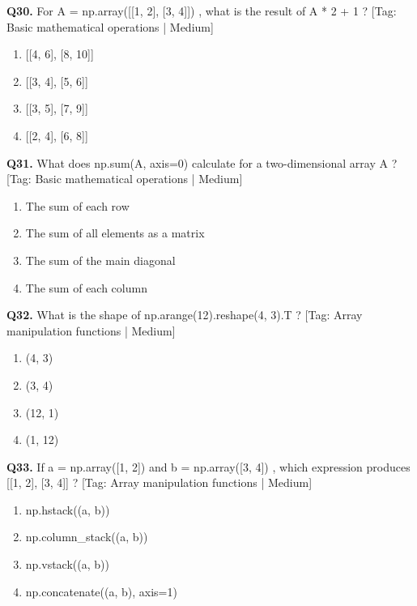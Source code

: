 \vspace{2mm}
\noindent\textbf{Q30.} For A = np.array([[1, 2], [3, 4]]) , what is the result of A * 2 + 1 ? \hfill [Tag: Basic mathematical operations | Medium]
\begin{enumerate}[label=(\alph*),topsep=2pt,itemsep=1pt,partopsep=0pt,parsep=0pt]
    \item {[[4, 6], [8, 10]]}
    \item {[[3, 4], [5, 6]]}
    \item {[[3, 5], [7, 9]]}
    \item {[[2, 4], [6, 8]]}
\end{enumerate}
\vspace{2mm}
\noindent\textbf{Q31.} What does np.sum(A, axis=0) calculate for a two-dimensional array A ? \hfill [Tag: Basic mathematical operations | Medium]
\begin{enumerate}[label=(\alph*),topsep=2pt,itemsep=1pt,partopsep=0pt,parsep=0pt]
    \item {The sum of each row}
    \item {The sum of all elements as a matrix}
    \item {The sum of the main diagonal}
    \item {The sum of each column}
\end{enumerate}
\vspace{2mm}
\noindent\textbf{Q32.} What is the shape of np.arange(12).reshape(4, 3).T ? \hfill [Tag: Array manipulation functions | Medium]
\begin{enumerate}[label=(\alph*),topsep=2pt,itemsep=1pt,partopsep=0pt,parsep=0pt]
    \item {(4, 3)}
    \item {(3, 4)}
    \item {(12, 1)}
    \item {(1, 12)}
\end{enumerate}
\vspace{2mm}
\noindent\textbf{Q33.} If a = np.array([1, 2]) and b = np.array([3, 4]) , which expression produces [[1, 2], [3, 4]] ? \hfill [Tag: Array manipulation functions | Medium]
\begin{enumerate}[label=(\alph*),topsep=2pt,itemsep=1pt,partopsep=0pt,parsep=0pt]
    \item {np.hstack((a, b))}
    \item {np.column\_stack((a, b))}
    \item {np.vstack((a, b))}
    \item {np.concatenate((a, b), axis=1)}
\end{enumerate}
